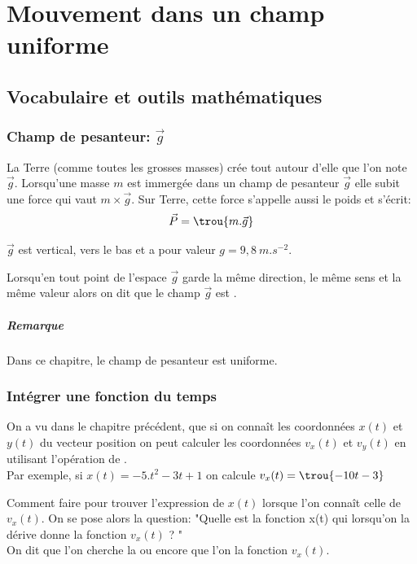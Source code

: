 \setcounter{chapter}{5}
\chapter{Mouvement dans un champ uniforme}
\section{Vocabulaire et outils mathématiques}
\subsection{Champ de pesanteur: $\vec{g}$}
  La Terre (comme toutes les grosses masses) crée tout autour d'elle  que l'on note $\vec{g}$. Lorsqu'une masse $m$ est immergée dans un champ de pesanteur $\vec{g}$ elle subit une force qui vaut $m\times \vec{g}$. Sur Terre, cette force s'appelle aussi le poids et s'écrit: $$\vec{P}=\trou{m.\vec{g}}$$

$\vec{g}$ est vertical, vers le bas et a pour valeur $g=9,8\:m.s^{-2}$.

Lorsqu'en tout point de l'espace $\vec{g}$ garde la même direction, le même sens et la même valeur alors on dit que le champ $\vec{g} $ est .
\paragraph*{Remarque} Dans ce chapitre, le champ de pesanteur est uniforme. 

\subsection{Intégrer une fonction du temps}


On a vu dans le chapitre précédent, que si on connaît les coordonnées $x(t)$ et $y(t)$ du vecteur position on peut calculer les coordonnées $v_x(t)$ et $v_y(t)$ en utilisant l'opération de .
\\
Par exemple, si $x(t)= -5.t^2 -3t +1$ on  calcule $v_x(t)=\trou{-10t-3}$


Comment faire pour trouver l'expression de $x(t)$ lorsque l'on connaît celle de $v_x(t)$.  On se pose alors la question: "Quelle est la fonction x(t) qui lorsqu'on la dérive donne la fonction $v_x(t)$ ? "\\ On dit que l'on cherche la  ou encore que l'on  la fonction $v_x(t)$.

